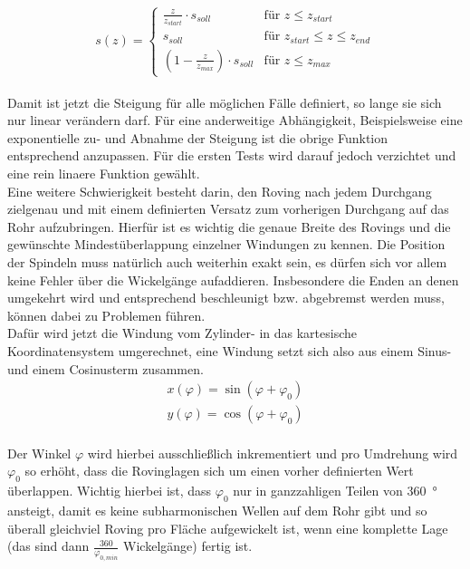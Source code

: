 \documentclass[paper=A4,pagesize,DIV=18, 12pt,listof=totoc,bibliography=totoc,headings=optiontohead,open=any]{article}
\begin{document}
\begin{equation}\label{steigungHin}
	s(z)=
	\begin{cases}
		\frac{z}{z_{start}} \cdot s_{soll} & \text{für } z \leq z_{start}\\
		s_{soll} & \text{für } z_{start} \leq z \leq z_{end}\\
		\left( 1 - \frac{z}{z_{max}}\right) \cdot s_{soll} & \text{für } z \leq z_{max}
	\end{cases}	
\end{equation}\\
Damit ist jetzt die Steigung für alle möglichen Fälle definiert, so lange sie sich nur linear verändern darf. Für eine anderweitige Abhängigkeit, Beispielsweise eine exponentielle zu- und Abnahme der Steigung ist die obrige Funktion entsprechend anzupassen. Für die ersten Tests wird darauf jedoch verzichtet und eine rein linaere Funktion gewählt.\\
Eine weitere Schwierigkeit besteht darin, den Roving nach jedem Durchgang zielgenau und mit einem definierten Versatz zum vorherigen Durchgang auf das Rohr aufzubringen. Hierfür ist es wichtig die genaue Breite des Rovings und die gewünschte Mindestüberlappung einzelner Windungen zu kennen. Die Position der Spindeln muss natürlich auch weiterhin exakt sein, es dürfen sich vor allem keine Fehler über die Wickelgänge aufaddieren. Insbesondere die Enden an denen umgekehrt wird und entsprechend beschleunigt bzw. abgebremst werden muss, können dabei zu Problemen führen.\\
Dafür wird jetzt die Windung vom Zylinder- in das kartesische Koordinatensystem umgerechnet, eine Windung setzt sich also aus einem Sinus- und einem Cosinusterm zusammen.\\
\begin{eqnarray}\label{zylinder2kartesischHin}
	x(\varphi) = \sin(\varphi + \varphi_0)\\
	y(\varphi) = \cos(\varphi + \varphi_0)
\end{eqnarray}\\
Der Winkel $\varphi$ wird hierbei ausschließlich inkrementiert und pro Umdrehung wird $\varphi_0$ so erhöht, dass die Rovinglagen sich um einen vorher definierten Wert überlappen. Wichtig hierbei ist, dass $\varphi_0$ nur in ganzzahligen Teilen von \SI{360}{\degree} ansteigt, damit es keine subharmonischen Wellen auf dem Rohr gibt und so überall gleichviel Roving pro Fläche aufgewickelt ist, wenn eine komplette Lage (das sind dann $\frac{360}{\varphi_{0,min}}$ Wickelgänge) fertig ist.\\
\end{document}
